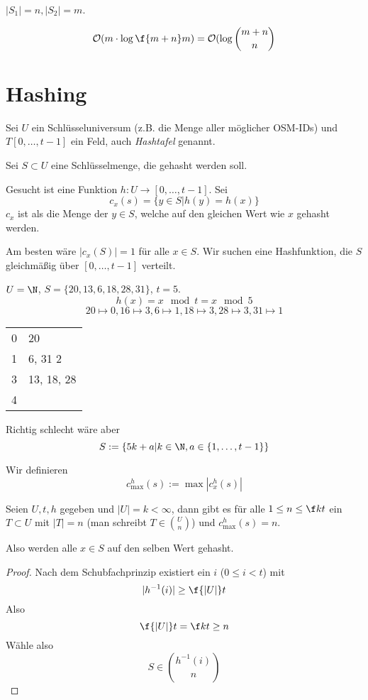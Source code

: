 \documentclass[11pt]{scrbook}
\renewcommand{\O}{\mathcal{O}}
\begin{document}


\begin{note}[Nachtrag]
	$|S_1| = n, |S_2| = m$.

	\[
		\O(m\cdot \log \f{m+n}m) = \O (\log \binom{m+n}{n}
	\]
\end{note}


\section{Hashing}

Sei $U$ ein Schlüsseluniversum (z.B. die Menge aller möglicher OSM-IDs) und $T[0,\dotsc, t-1]$ ein Feld, auch \emph{Hashtafel} genannt.

Sei $S\subset U$ eine Schlüsselmenge, die gehasht werden soll.

Gesucht ist eine Funktion $h: U \to [0,\dotsc, t-1]$.
Sei 
\[
	c_x(s) = \{y\in S | h(y) = h(x)\}
\]
$c_x$ ist als die Menge der $y\in S$, welche auf den gleichen Wert wie $x$ gehasht werden.

Am besten wäre $|c_x(S)| = 1$ für alle $x\in S$.
Wir suchen eine Hashfunktion, die $S$ gleichmäßig über $[0,\dotsc, t-1]$ verteilt.

\begin{ex}
	$U = \N$, $S = \{20,13,6,18,28,31\}$, $t=5$.
	\[
		h(x) = x \mod t = x \mod 5
	\]
	\[
		20\mapsto 0, 16 \mapsto 3, 6 \mapsto 1, 18 \mapsto 3, 28 \mapsto 3, 31 \mapsto 1
	\]
	\begin{tabular}{r|l}
		0 & 20 \\
		1 & 6, 31
		2   \\
		3 & 13, 18, 28 \\
		4  \\
	\end{tabular}
	Richtig schlecht wäre aber
	\[
		S := \{5k + a | k\in \N, a\in \{1,\dotsc, t-1\}\}
	\]
\end{ex}


\begin{df}
	Wir definieren 
	\[
		c_{\max}^h(s) := \max |c_x^h (s)|
	\]
\end{df}


\begin{st}
	Seien $U, t, h$ gegeben und $|U| = k < \infty$, dann gibt es für alle $1\le n\le \f kt$ ein $T\subset U$ mit $|T|=n$ (man schreibt $T\in \binom{U}{n}$) und $c_{\max}^h(s) =n$.

	Also werden alle $x\in S$ auf den selben Wert gehasht.
	\begin{proof}
		Nach dem Schubfachprinzip existiert ein $i$ ($0\le i<t$) mit 
		\[
			|h^{-1}(i)| \ge \f{|U|}t
		\]
		Also
		\[
			\f {|U|}t = \f kt \ge n
		\]
		Wähle also
		\[
		S \in \binom{ h^{-1}(i)}{n}
		\]
	\end{proof}
\end{st}
\end{document}
